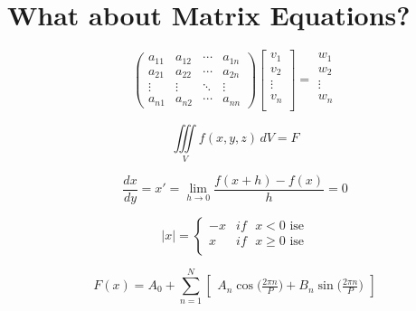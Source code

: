 \documentclass{article}
\begin{document}
\section{What about Matrix Equations?}
\begin{equation*}
\begin{pmatrix}
a_{11} & a_{12} & \cdots & a_{1n} \\
a_{21} & a_{22} & \cdots & a_{2n} \\
\vdots  & \vdots  & \ddots & \vdots  \\
a_{n1} & a_{n2} & \cdots & a_{nn} 
\end{pmatrix}
%
  \begin{bmatrix}
    v_{1} \\
    v_{2} \\
    \vdots\\
    v_{n} \\
  \end{bmatrix} 
% 
=
\begin{matrix}
    w_{1} \\
    w_{2} \\
    \vdots\\
    w_{n} \\
  \end{matrix}
\end{equation*}

 \pagebreak

   

\begin{displaymath}
  \iiint\limits_V f(x,y,z) \, dV =F  
\end{displaymath}

\begin{displaymath}
\frac{dx}{dy} = x'= \lim\limits_{h \to 0} \frac{f(x + h )-f(x)}{h}= 0  
\end{displaymath} 

 \begin{displaymath}
|x| = \left\{ \begin{array}{ll}
-x & if \textrm{ $x<0$ ise}\\
x & if \textrm{ $x \geq 0$ ise}\\
\end{array} \right.
\end{displaymath}
 
\begin{displaymath}
F(x) = A_{0}+
\sum_{n=1}^{N} \begin{bmatrix}
  A_{n}\cos\Big(\frac{2\pi n}{P}\Big)+
  B_{n}\sin\Big(\frac{2\pi n}{P}\Big)
  \end{bmatrix} 
\end{displaymath}
\end{document}
